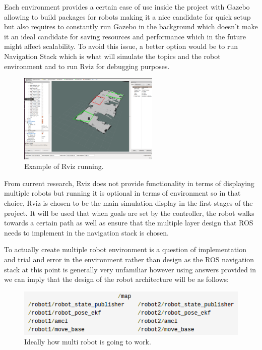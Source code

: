      Each environment provides a certain ease of use inside the project with Gazebo allowing to build packages for robots making it a nice candidate for quick setup but also requires to constantly run Gazebo in the background which doesn't make it an ideal candidate for saving resources and performance which in the future might affect scalability. To avoid this issue, a better option would be to run Navigation Stack which is what will simulate the topics and the robot environment and to run Rviz for debugging purposes.

        \begin{figure}[!ht]  
          \centering
            \includegraphics[width=0.6\textwidth]{figures/RVIZ.png}
            \caption{Example of Rviz running.}
        \end{figure}

      From current research, Rviz does not provide functionality in terms of displaying multiple robots but running it is optional in terms of environment so in that choice, Rviz is chosen to be the main simulation display in the first stages of the project. It will be used that when goals are set by the controller, the robot walks towards a certain path as well as ensure that the multiple layer design that ROS needs to implement in the navigation stack is chosen.

      To actually create multiple robot environment is a question of implementation and trial and error in the environment rather than design as the ROS navigation stack at this point is generally very unfamiliar however using answers provided in \cite{wiki1} we can imply that the design of the robot architecture will be as follows:

        \begin{figure}[!ht]  
          \centering
            \includegraphics[width=1\textwidth]{figures/ROSPlan.png}
            \caption{Ideally how multi robot is going to work.}
        \end{figure}

